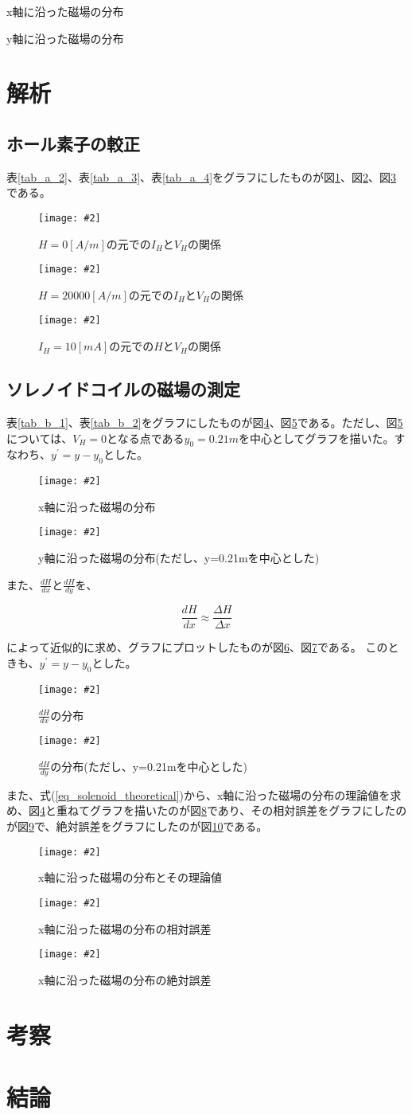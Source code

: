 \documentclass[uplatex,11pt]{jsarticle}
\newcommand{\cir}[3]{ %
    \begin{figure}
        \begin{center}
            \texttt{[image: \#2]}
            \caption{#3}
            \label{fg_#1}
         \end{center}
    \end{figure}
}
\newcommand{\tab}[4]{ %
    \begin{table}[htb]
        \centering
        \caption{#3}
        
        \label{tab_#1}
    \end{table}
}
\newcommand{\fr}[1]{図\ref{fg_#1}}
\newcommand{\tr}[1]{表\ref{tab_#1}}
\newcommand{\er}[1]{式(\ref{#1})}
\begin{document}
\tab{b_1}{./csv/jikken_b_1.csv}{x軸に沿った磁場の分布}{3}
\tab{b_2}{./csv/jikken_b_2.csv}{y軸に沿った磁場の分布}{3}

\section{解析}
\subsection{ホール素子の較正}

\tr{a_2}、\tr{a_3}、\tr{a_4}をグラフにしたものが\fr{a_2}、\fr{a_3}、\fr{a_4}である。

\cir{a_2}{./graph/jikken_a_2.png}{ $ H=0[A/m] $の元での$I_H$と$V_H$の関係 }
\cir{a_3}{./graph/jikken_a_3.png}{ $ H=20000[A/m] $の元での$I_H$と$V_H$の関係 }
\cir{a_4}{./graph/jikken_a_4.png}{ $ I_H = 10[mA] $の元での$H$と$V_H$の関係 }

\subsection{ソレノイドコイルの磁場の測定}

\tr{b_1}、\tr{b_2}をグラフにしたものが\fr{b_1}、\fr{b_2}である。ただし、\fr{b_2}については、$V_H = 0$となる点である$y_0=0.21m$を中心としてグラフを描いた。すなわち、$y^{\prime} = y - y_0$とした。

\cir{b_1}{./graph/jikken_b_1.png}{ x軸に沿った磁場の分布 }
\cir{b_2}{./graph/jikken_b_2.png}{ y軸に沿った磁場の分布(ただし、y=0.21mを中心とした) }

また、$ \frac{dH}{dx} $と$ \frac{dH}{dy} $を、

\[
    \frac{dH}{dx} \approx \frac{\Delta H}{ \Delta x }
\]

によって近似的に求め、グラフにプロットしたものが\fr{b_1_differential}、\fr{b_2_differential}である。
このときも、$y^{\prime} = y - y_0$とした。

\cir{b_1_differential}{./graph/jikken_b_1_differential.png}{ $\frac{dH}{dx}$の分布 }
\cir{b_2_differential}{./graph/jikken_b_2_differential.png}{ $\frac{dH}{dy}$の分布(ただし、y=0.21mを中心とした) }

また、\er{eq_solenoid_theoretical}から、x軸に沿った磁場の分布の理論値を求め、\fr{b_1}と重ねてグラフを描いたのが\fr{b_1_theoretical_comparizon}であり、その相対誤差をグラフにしたのが\fr{b_1_relative_error}で、絶対誤差をグラフにしたのが\fr{b_1_absolute_error}である。

\cir{b_1_theoretical_comparizon}{./graph/jikken_b_1_theoretical_comparizon.png}{ x軸に沿った磁場の分布とその理論値 }
\cir{b_1_relative_error}{./graph/jikken_b_1_relative_error.png}{ x軸に沿った磁場の分布の相対誤差 }
\cir{b_1_absolute_error}{./graph/jikken_b_1_absolute_error.png}{ x軸に沿った磁場の分布の絶対誤差 }

\section{考察}



\section{結論}
\end{document}
